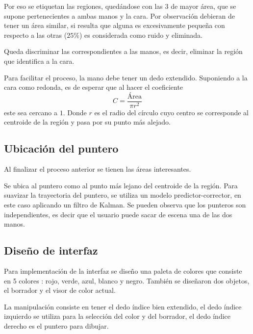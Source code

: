 \documentclass[portrait,a0paper,fontscale=0.277]{baposter}
\begin{document}
\begin{poster}
{   		 Por eso se etiquetan las regiones, quedándose con las $3$ de mayor área,
   	 que se supone pertenecientes a ambas manos y la cara.
   	 Por observación debieran de tener un área similar, si resulta que alguna
   		 es excesivamente pequeña con respecto a las otras ($25\%$) es considerada
   	 como ruido y eliminada.

   	 
   		 Queda discriminar las correspondientes a las manos,
   	 es decir, eliminar la región que identifica a la cara.

   	 Para facilitar el proceso, la mano debe tener un dedo extendido.
   	 Suponiendo a la cara como redonda, es de esperar que al hacer
   	 el coeficiente
   		 \[C = \frac{\mbox{Área}}{\pi r^2}\]
   	 este sea cercano a $1$. Donde $r$ es el radio del círculo cuyo centro
   	 se corresponde al centroide de la región y pasa por su punto más alejado.

    \subsection{Ubicación del puntero}
   	Al finalizar el proceso anterior se tienen las áreas interesantes.

   	 Se ubica al puntero como al punto más lejano del centroide de la región.
 Para suavizar la trayectoria del puntero, se utiliza un modelo predictor-corrector, en este caso aplicando un filtro de Kalman.
Se pueden observa que los punteros son independientes, es decir que el usuario puede sacar de escena  una de las dos manos.

\subsection{Diseño de interfaz}
  Para implementación de la interfaz se diseño una paleta de colores que consiste en 5 colores : rojo, verde, azul, blanco y negro. También se diseñaron dos objetos, el borrador y el visor de color actual.

La manipulación consiste en tener el dedo índice bien extendido, el dedo índice izquierdo se utiliza para la selección del color y del borrador, el dedo índice derecho es el puntero para dibujar.

	}


\end{poster}
\end{document}
